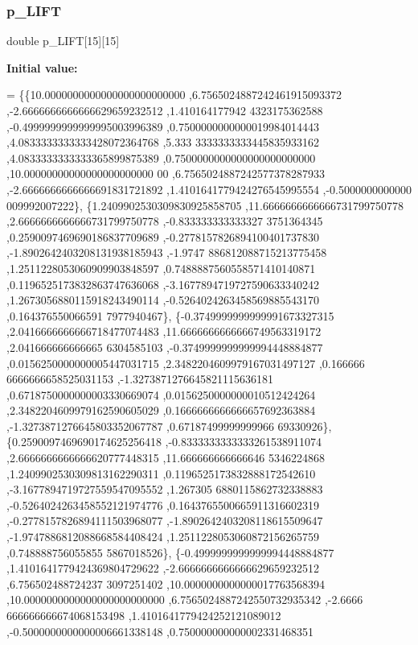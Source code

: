 \subsubsection{\texorpdfstring{p\+\_\+\+L\+I\+FT}{p\_LIFT}}
{\footnotesize\ttfamily double p\+\_\+\+L\+I\+FT\mbox{[}15\mbox{]}\mbox{[}15\mbox{]}}

{\bfseries Initial value\+:}
\begin{DoxyCode}
= \{\{10.0000000000000000000000000 ,6.7565024887242461915093372 ,-2.6666666666666629659232512 ,1.410164177942
      4323175362588 ,-0.4999999999999995003996389 ,0.7500000000000019984014443 ,4.0833333333333428072364768 ,5.333
      3333333333445835933162 ,4.0833333333333365899875389 ,0.7500000000000000000000000 ,10.00000000000000000000000
      00 ,6.7565024887242577378287933 ,-2.6666666666666691831721892 ,1.4101641779424276545995554 ,-0.5000000000000
      009992007222\},
\{1.2409902530309830925858705 ,11.6666666666666731799750778 ,2.6666666666666731799750778 ,-0.833333333333327
      3751364345 ,0.2590097469690186837709689 ,-0.2778157826894100401737830 ,-1.8902642403208131938185943 ,-1.9747
      886812088715213775458 ,1.2511228053060909903848597 ,0.7488887560558571410140871 ,0.1196525173832863747636068
       ,-3.1677894719727590633340242 ,1.2673056880115918243490114 ,-0.5264024263458569885543170 ,0.164376550066591
      7977940467\},
\{-0.3749999999999991673327315 ,2.0416666666666718477074483 ,11.6666666666666749563319172 ,2.041666666666665
      6304585103 ,-0.3749999999999994448884877 ,0.0156250000000005447031715 ,2.3482204609979167031497127 ,0.166666
      6666666658525031153 ,-1.3273871276645821115636181 ,0.6718750000000003330669074 ,0.0156250000000010512424264 
      ,2.3482204609979162590605029 ,0.1666666666666657692363884 ,-1.3273871276645803352067787 ,0.67187499999999966
      69330926\},
\{0.2590097469690174625256418 ,-0.8333333333333261538911074 ,2.6666666666666620777448315 ,11.666666666666646
      5346224868 ,1.2409902530309813162290311 ,0.1196525173832888172542610 ,-3.1677894719727559547095552 ,1.267305
      6880115862732338883 ,-0.5264024263458552121974776 ,0.1643765500665911316602319 ,-0.2778157826894111503968077
       ,-1.8902642403208118615509647 ,-1.9747886812088668584408424 ,1.2511228053060872156265759 ,0.748888756055855
      5867018526\},
\{-0.4999999999999994448884877 ,1.4101641779424369804729622 ,-2.6666666666666629659232512 ,6.756502488724237
      3097251402 ,10.0000000000000017763568394 ,10.0000000000000000000000000 ,6.7565024887242550732935342 ,-2.6666
      666666666674068153498 ,1.4101641779424252121089012 ,-0.5000000000000006661338148 ,0.750000000000002331468351

\end{DoxyCode}

